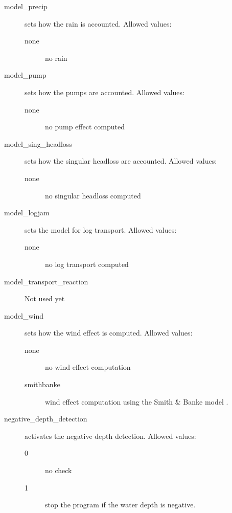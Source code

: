 \begin{description}
\item[model\_precip] sets how the rain is accounted. Allowed values:
\begin{description}
    \item[none] no rain
\end{description}

\item[model\_pump] sets how the pumps are accounted. Allowed values:
\begin{description}
    \item[none] no pump effect computed
\end{description}

\item[model\_sing\_headloss] sets how the singular headloss are accounted. Allowed values:
\begin{description}
    \item[none] no singular headloss computed
\end{description}

\item[model\_logjam] sets the model for log transport. Allowed values:
\begin{description}
    \item[none] no log transport computed
\end{description}

\item[model\_transport\_reaction] Not used yet


\item[model\_wind] sets how the wind effect is computed. Allowed values:
\begin{description}
    \item[none] no wind effect computation
    \item[smithbanke] wind effect computation using the Smith \& Banke model  .
\end{description}

\item[negative\_depth\_detection] activates the negative depth detection. Allowed values:
\begin{description}
    \item[0] no check
    \item[1] stop the program if the water depth is negative.
\end{description}


\end{description}

